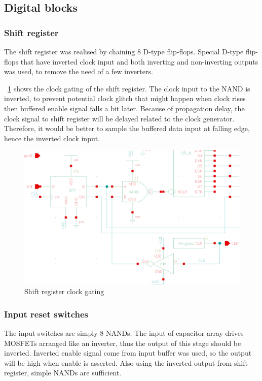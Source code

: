 \documentclass[journal]{IEEEtran}
\newcommand{\fref}[1]{\figurename~\ref{#1}}
\begin{document}
\subsection{Digital blocks}

\subsubsection{Shift register}

The shift register was realised by chaining 8 D-type flip-flops. Special D-type flip-flops that have inverted clock input and both inverting and non-inverting outputs was used, to remove the need of a few inverters.

\fref{fig_clock} shows the clock gating of the shift register. The clock input to the NAND is inverted, to prevent potential clock glitch that might happen when clock rises then buffered enable signal falls a bit later. Because of propagation delay, the clock signal to shift register will be delayed related to the clock generator. Therefore, it would be better to sample the buffered data input at falling edge, hence the inverted clock input.

\begin{figure}[!t]
	\centering
	\includegraphics[width=\columnwidth]{clock}
	\caption{Shift register clock gating}
	\label{fig_clock}
\end{figure}

\subsubsection{Input reset switches}

The input switches are simply 8 NANDs. The input of capacitor array drives MOSFETs arranged like an inverter, thus the output of this stage should be inverted. Inverted enable signal come from input buffer was used, so the output will be high when enable is asserted. Also using the inverted output from shift register, simple NANDs are sufficient.
\end{document}
